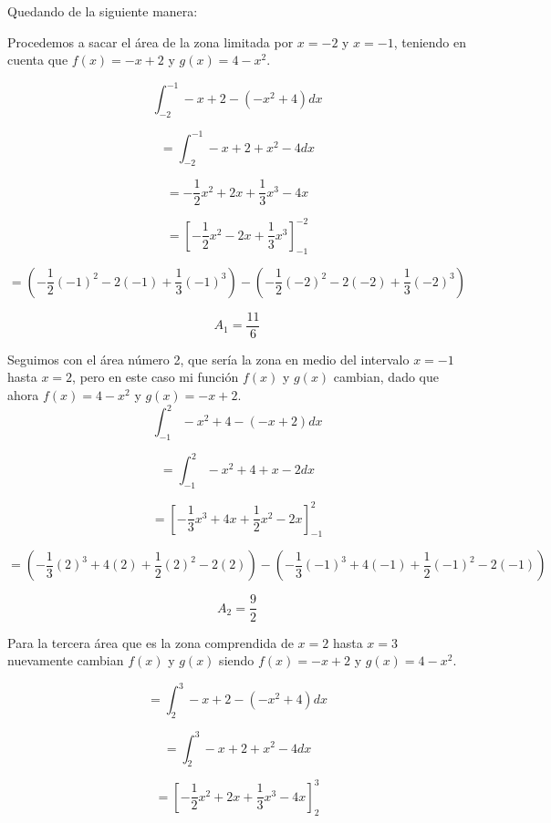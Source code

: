 \documentclass[12pt]{article}
\begin{document}
\begin{flushleft}
Quedando de la siguiente manera:\\
\vspace{0.5cm}

\newpage



Procedemos a sacar el área de la zona limitada por $x=-2$ y $x=-1$, teniendo en cuenta que  $f\left(x\right)=-x+2$ y $g\left(x\right)=4-x^{2}$.

$$\int_{-2}^{-1}-x+2-\left ( -x^{2}+4 \right )dx$$

$$=\int_{-2}^{-1}-x+2 + x^{2}-4 dx$$

$$=-\frac{1}{2}x^{2}+2x+\frac{1}{3}x^{3}-4x$$

$$=\left [-\frac{1}{2}x^{2}-2x+\frac{1}{3}x^{3} \right ]_{-1}^{-2}$$


$$=\left(-\frac{1}{2}\left ( -1\right )^{2}-2\left ( -1 \right )+\frac{1}{3}\left ( -1 \right )^{3}\right)-\left(-\frac{1}{2}\left ( -2\right )^{2}-2\left ( -2 \right )+\frac{1}{3}\left ( -2 \right )^{3}\right)$$

$$A_{1}=\frac{11}{6}$$

Seguimos con el área número 2, que sería la zona en medio del intervalo $x=-1$ hasta $x=2$, pero en este caso mi función $f\left(x\right)$ y $g\left(x\right)$ cambian, dado que ahora $f\left(x\right)=4-x^{2}$ y $g\left(x\right)=-x+2$.\\

$$\int_{-1}^{2}-x^{2}+4-\left ( -x+2 \right )dx$$

$$=\int_{-1}^{2}-x^{2}+4 + x-2dx$$

$$=\left [ -\frac{1}{3}x^{3}+4x+\frac{1}{2}x^{2}-2x \right ]_{-1}^{2}$$

$$=\left(-\frac{1}{3}\left ( 2 \right )^{3}+4\left ( 2 \right )+\frac{1}{2}\left ( 2 \right )^{2}-2\left ( 2 \right )\right)-\left(-\frac{1}{3}\left ( -1\right )^{3}+4\left ( -1 \right )+\frac{1}{2}\left ( -1 \right )^{2}-2\left ( -1 \right )\right)$$



$$A_{2}=\frac{9}{2}$$


Para la tercera área que es la zona comprendida de $x=2$ hasta $x=3$ nuevamente cambian $f\left(x\right)$ y $g\left(x\right)$ siendo  $f\left(x\right)=-x+2$ y $g\left(x\right)=4-x^{2}$.


$$=\int_{2}^{3}-x+2-\left ( -x ^{2}+4\right ) dx$$

$$=\int_{2}^{3}-x+2 +x ^{2}-4 dx$$

$$=\left[-\frac{1}{2}x^{2}+2x+\frac{1}{3}x^{3}-4x\right]_{2}^{3}$$



\end{flushleft}
\end{document}
